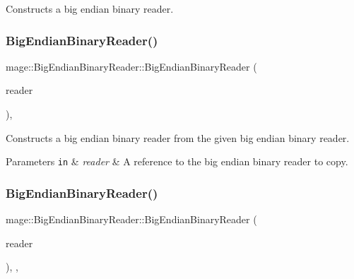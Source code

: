 Constructs a big endian binary reader. \mbox{\label{classmage_1_1_big_endian_binary_reader_a9d490263268290217ae4f2f06e0699c4}} 
\subsubsection{\texorpdfstring{Big\+Endian\+Binary\+Reader()}{BigEndianBinaryReader()}\hspace{0.1cm}{\footnotesize\ttfamily [2/3]}}
{\footnotesize\ttfamily mage\+::\+Big\+Endian\+Binary\+Reader\+::\+Big\+Endian\+Binary\+Reader (\begin{DoxyParamCaption}\item[{const \mbox{\hyperlink{classmage_1_1_big_endian_binary_reader}{Big\+Endian\+Binary\+Reader}} \&}]{reader }\end{DoxyParamCaption})\hspace{0.3cm}{\ttfamily [protected]}, {\ttfamily [delete]}}

Constructs a big endian binary reader from the given big endian binary reader.


\begin{DoxyParams}[1]{Parameters}
\mbox{\tt in}  & {\em reader} & A reference to the big endian binary reader to copy. \\
\hline
\end{DoxyParams}
\mbox{\label{classmage_1_1_big_endian_binary_reader_a16c4303dfb333ebdddfc07c924b9735a}} 
\subsubsection{\texorpdfstring{Big\+Endian\+Binary\+Reader()}{BigEndianBinaryReader()}\hspace{0.1cm}{\footnotesize\ttfamily [3/3]}}
{\footnotesize\ttfamily mage\+::\+Big\+Endian\+Binary\+Reader\+::\+Big\+Endian\+Binary\+Reader (\begin{DoxyParamCaption}\item[{\mbox{\hyperlink{classmage_1_1_big_endian_binary_reader}{Big\+Endian\+Binary\+Reader}} \&\&}]{reader }\end{DoxyParamCaption})\hspace{0.3cm}{\ttfamily [protected]}, {\ttfamily [default]}, {\ttfamily [noexcept]}}

